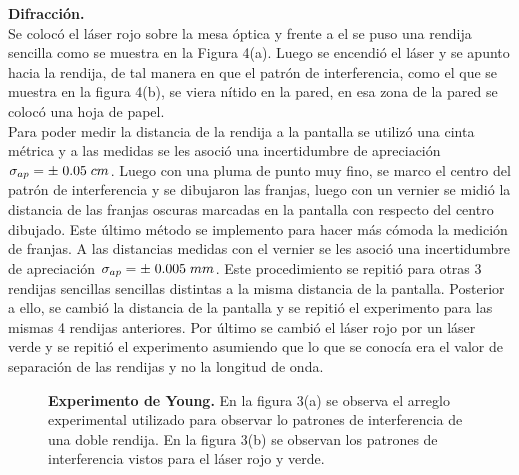 \documentclass[DIV=calc, paper=a4, fontsize=10.5pt]{scrartcl}
\begin{document}
\textbf{\textcolor{carmine}{Difracción.}}\\
Se colocó el láser rojo  sobre la mesa óptica y frente a el se puso una rendija sencilla como se muestra en la Figura 4(a). Luego se encendió el láser y se apunto hacia la rendija, de tal manera en que  el patrón de interferencia, como el que se muestra en la figura 4(b), se viera nítido en la pared, en esa zona de la pared se colocó una hoja de papel.\\Para poder medir la distancia de la rendija a la pantalla se utilizó una cinta métrica y a las medidas se les asoció una incertidumbre de apreciación $\sigma_{ap}=\pm\hspace{0.1cm}0.05\hspace{0.1cm}cm$. Luego con una pluma de punto muy fino, se marco el centro del patrón de interferencia y se dibujaron las franjas, luego con un vernier se midió la distancia de las franjas oscuras  marcadas en la pantalla con respecto del centro dibujado. Este último método se implemento para hacer más cómoda la medición de franjas. A las distancias medidas con el vernier se les asoció una incertidumbre de apreciación $\sigma_{ap}=\pm\hspace{0.1cm}0.005\hspace{0.1cm}mm$. 
Este procedimiento se repitió para otras 3 rendijas sencillas sencillas distintas
a la misma distancia de la pantalla. Posterior a ello, se cambió la distancia de la pantalla y se repitió el experimento para las mismas 4 rendijas anteriores.
Por último se cambió el láser rojo por un láser verde y se repitió el experimento asumiendo que lo que se conocía era el valor de separación de las rendijas y no la longitud de onda.
\begin{figure}[H]
 \centering
 \caption{\textbf{Experimento de Young.} En la figura 3(a) se observa el arreglo experimental utilizado para observar lo patrones de interferencia de una doble rendija. En la figura 3(b) se observan los patrones de interferencia vistos para el láser rojo y verde. }
 \label{f:animales}
\end{figure}
\end{document}

